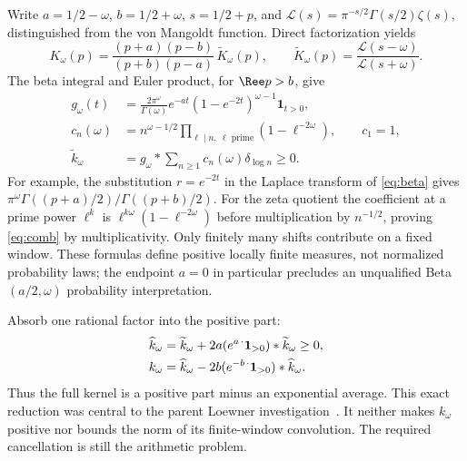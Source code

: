 Write $a=1/2-\omega$, $b=1/2+\omega$, $s=1/2+p$, and
$\mathcal L(s)=\pi^{-s/2}\Gamma(s/2)\zeta(s)$, distinguished from the
von Mangoldt function. Direct factorization yields
\begin{equation}\label{eq:factor}
 K_\omega(p)=\frac{(p+a)(p-b)}{(p+b)(p-a)}\,
 \widetilde K_\omega(p),\qquad
 \widetilde K_\omega(p)=\frac{\mathcal L(s-\omega)}{\mathcal L(s+\omega)}.
\end{equation}
The beta integral and Euler product, for $\Ree p>b$, give
\begin{align}
 g_\omega(t)&=\frac{2\pi^\omega}{\Gamma(\omega)}
 e^{-a t}(1-e^{-2t})^{\omega-1}\mathbf1_{t>0},\label{eq:beta}\\
 c_n(\omega)&=n^{\omega-1/2}\prod_{\ell\mid n,\ \ell\text{ prime}}
 (1-\ell^{-2\omega}),\qquad c_1=1,\label{eq:comb}\\
 \widetilde k_\omega&=g_\omega*\sum_{n\geq1}c_n(\omega)\delta_{\log n}\geq0.
 \label{eq:positive-part}
\end{align}
For example, the substitution $r=e^{-2t}$ in the Laplace transform of
\eqref{eq:beta} gives
$\pi^\omega\Gamma((p+a)/2)/\Gamma((p+b)/2)$.
For the zeta quotient the coefficient at a prime power $\ell^k$ is
$\ell^{k\omega}(1-\ell^{-2\omega})$ before multiplication by
$n^{-1/2}$, proving \eqref{eq:comb} by multiplicativity.
Only finitely many shifts contribute on a fixed window. These formulas
define positive locally finite measures, not normalized probability
laws; the endpoint $a=0$ in particular precludes an unqualified
Beta$(a/2,\omega)$ probability interpretation.

Absorb one rational factor into the positive part:
\begin{align}
 \widehat k_\omega
 &=\widetilde k_\omega+2a(e^{a\,\cdot}\mathbf1_{>0})*
 \widetilde k_\omega\geq0,\notag\\
 k_\omega&=\widehat k_\omega
 -2b(e^{-b\,\cdot}\mathbf1_{>0})*\widehat k_\omega.
 \label{eq:rational-subtraction}
\end{align}
Thus the full kernel is a positive part minus an exponential average.
This exact reduction was central to the parent Loewner
investigation~\cite{ParentLoewner}. It neither makes $k_\omega$ positive
nor bounds the norm of its finite-window convolution. The required
cancellation is still the arithmetic problem.

